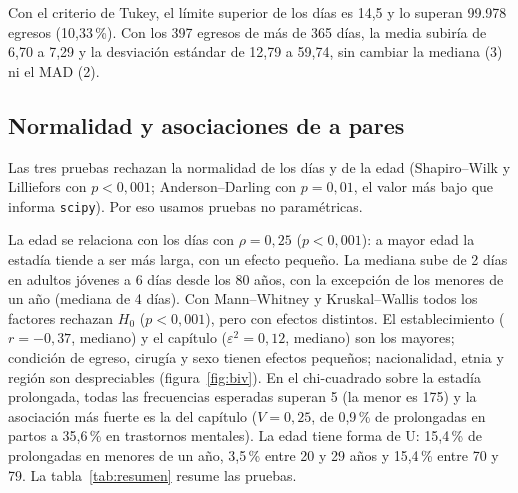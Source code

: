 \documentclass[10.5pt,a4paper,headings=small,abstract=false]{scrartcl}
\newcommand{\pct}{\,\%}
\begin{document}
Con el criterio de Tukey, el límite superior de los días es 14,5 y lo superan 99.978 egresos (10,33\pct{}). Con los 397 egresos de más de 365 días, la media subiría de 6,70 a 7,29 y la desviación estándar de 12,79 a 59,74, sin cambiar la mediana (3) ni el MAD (2).

\subsection{Normalidad y asociaciones de a pares}

Las tres pruebas rechazan la normalidad de los días y de la edad (Shapiro--Wilk y Lilliefors con $p<0{,}001$; Anderson--Darling con $p=0{,}01$, el valor más bajo que informa \texttt{scipy}). Por eso usamos pruebas no paramétricas.

La edad se relaciona con los días con $\rho=0{,}25$ ($p<0{,}001$): a mayor edad la estadía tiende a ser más larga, con un efecto pequeño. La mediana sube de 2 días en adultos jóvenes a 6 días desde los 80 años, con la excepción de los menores de un año (mediana de 4 días). Con Mann--Whitney y Kruskal--Wallis todos los factores rechazan $H_0$ ($p<0{,}001$), pero con efectos distintos. El establecimiento ($r=-0{,}37$, mediano) y el capítulo ($\varepsilon^2=0{,}12$, mediano) son los mayores; condición de egreso, cirugía y sexo tienen efectos pequeños; nacionalidad, etnia y región son despreciables (figura~\ref{fig:biv}). En el chi-cuadrado sobre la estadía prolongada, todas las frecuencias esperadas superan 5 (la menor es 175) y la asociación más fuerte es la del capítulo ($V=0{,}25$, de 0,9\pct{} de prolongadas en partos a 35,6\pct{} en trastornos mentales). La edad tiene forma de U: 15,4\pct{} de prolongadas en menores de un año, 3,5\pct{} entre 20 y 29 años y 15,4\pct{} entre 70 y 79. La tabla~\ref{tab:resumen} resume las pruebas.
\end{document}
